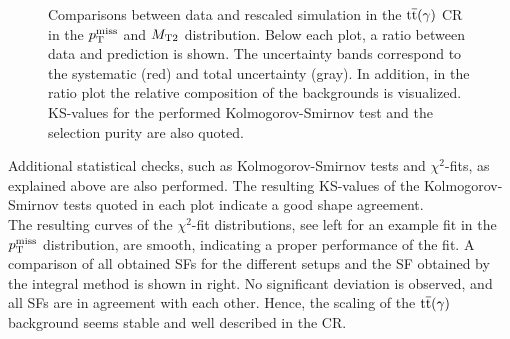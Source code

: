 \begin{figure}[tbp]
 \caption{Comparisons between data and rescaled simulation in the ${\mathrm{t}\overline{\mathrm{t}}}(\gamma)$ CR in the $p_{\mathrm{T}}^\text{miss}$ and $M_{\mathrm{T2}}$ distribution. Below each plot, a ratio between data and prediction is shown. The uncertainty bands correspond to the systematic (red) and total uncertainty (gray). In addition, in the ratio plot the relative composition of the backgrounds is visualized. KS-values for the performed Kolmogorov-Smirnov test and the selection purity are also quoted.}
 \label{fig:CRTT}
\end{figure}
Additional statistical checks, such as Kolmogorov-Smirnov tests and $\chi^2$-fits, as explained above are also performed. The resulting KS-values of the Kolmogorov-Smirnov tests quoted in each plot indicate a good shape agreement.\\
The resulting curves of the $\chi^2$-fit distributions, see  left for an example fit in the $p_{\mathrm{T}}^\text{miss}$ distribution, are smooth, indicating a proper performance of the fit. A comparison of all obtained SFs for the different setups and the SF obtained by the integral method is shown in  right. No significant deviation is observed, and all SFs are in agreement with each other. Hence, the scaling of the ${\mathrm{t}\overline{\mathrm{t}}}(\gamma)$ background seems stable and well described in the CR.
